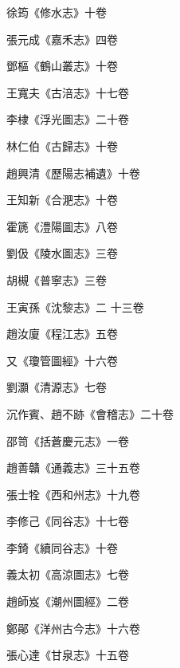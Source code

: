 \begin{pinyinscope}
 徐筠《修水志》十卷



 張元成《嘉禾志》四卷



 鄧樞《鶴山叢志》十卷



 王寬夫《古涪志》十七卷



 李棣《浮光圖志》二十卷



 林仁伯《古歸志》十卷



 趙興清《歷陽志補遺》十卷



 王知新《合淝志》十卷



 霍篪《澧陽圖志》八卷



 劉伋《陵水圖志》三卷



 胡槻《普寧志》三卷



 王寅孫《沈黎志》二
 十三卷



 趙汝廈《程江志》五卷



 又《瓊管圖經》十六卷



 劉灝《清源志》七卷



 沉作賓、趙不跡《會稽志》二十卷



 邵笥《括蒼慶元志》一卷



 趙善贛《通義志》三十五卷



 張士牷《西和州志》十九卷



 李修己《同谷志》十七卷



 李錡《續同谷志》十卷



 義太初《高涼圖志》七卷



 趙師岌《潮州圖經》二卷



 鄭鄖《洋州古今志》十六卷



 張心達《甘泉志》十五卷




\end{pinyinscope}
